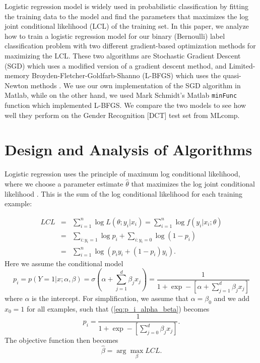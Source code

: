 \documentclass{article} %
\newcommand{\argmax}{\arg\!\max}
\begin{document}
Logistic regression model is widely used in probabilistic classification by fitting the training data to the model and find the parameters that maximizes the log joint conditional likelihood (LCL) of the training set.
In this paper, we analyze how to train a logistic regression model for our binary (Bernoulli) label classification problem with two different gradient-based optimization methods for maximizing the LCL.
These two algorithms are Stochastic Gradient Descent (SGD) which uses a modified version of a gradient descent method, and Limited-memory Broyden-Fletcher-Goldfarb-Shanno (L-BFGS) which uses the quasi-Newton methods \cite{wiki_lbfgs}.
We use our own implementation of the SGD algorithm in Matlab, while on the other hand, we used Mark Schmidt's Matlab {\tt minFunc} function which implemented L-BFGS.
We compare the two models to see how well they perform on the Gender Recognition [DCT] test set from MLcomp.

\section{Design and Analysis of Algorithms}
\label{sec:algorithms}




Logistic regression uses the principle of maximum log conditional likelihood, where we choose a parameter estimate $\hat{\theta}$ that maximizes the log joint conditional likelihood \cite{elkan}. This is the sum of the log conditional likelihood for each training example:

\begin{eqnarray} \label{LCL}
LCL &=& \sum_{i=1}^{n} \log L(\theta;y_i|x_i) = \sum_{i=1}^{n} \log f(y_i|x_i;\theta) \nonumber \\
    &=& \sum_{i:y_i=1} \log p_i + \sum_{i:y_i=0} \log (1-p_i) \nonumber \\
    &=& \sum_{i=1}^{n} \log (p_iy_i +(1-p_i)y_i).
\end{eqnarray}
Here we assume the conditional model
\begin{equation} \label{eq:p_i_alpha_beta}
p_i = p(Y=1|x;\alpha,\beta) = \sigma(\alpha + \sum_{j=1}^{d}\beta_{j}x_j) = \frac{1}{1+\exp-[\alpha+\sum_{j=1}^{d}\beta_{j}x_j]}
\end{equation}
where $\alpha$ is the intercept. For simplification, we assume that $\alpha = \beta_0$ and we add $x_0 = 1$ for all examples, such that (\ref{eq:p_i_alpha_beta}) becomes
\begin{equation} \label{eq:p_i}
p_i = \frac{1}{1+\exp-[\sum_{j=0}^{d}\beta_{j}x_j]}.
\end{equation}
The objective function then becomes
\begin{equation} \label{eq:objfun}
\hat{\beta} = \argmax_{\beta} LCL.
\end{equation}
\end{document}
